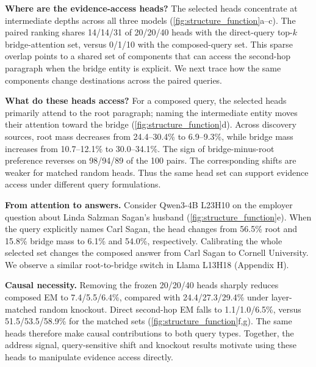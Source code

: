 \textbf{Where are the evidence-access heads?} The selected heads concentrate at intermediate depths across all three models (\cref{fig:structure_function}a--c). The paired ranking shares 14/14/31 of 20/20/40 heads with the direct-query top-$k$ bridge-attention set, versus 0/1/10 with the composed-query set. This sparse overlap points to a shared set of components that can access the second-hop paragraph when the bridge entity is explicit. We next trace how the same components change destinations across the paired queries.

\textbf{What do these heads access?} For a composed query, the selected heads primarily attend to the root paragraph; naming the intermediate entity moves their attention toward the bridge (\cref{fig:structure_function}d). Across discovery sources, root mass decreases from 24.4--30.4\% to 6.9--9.3\%, while bridge mass increases from 10.7--12.1\% to 30.0--34.1\%. The sign of bridge-minus-root preference reverses on 98/94/89 of the 100 pairs. The corresponding shifts are weaker for matched random heads. Thus the same head set can support evidence access under different query formulations.

\textbf{From attention to answers.} Consider Qwen3-4B L23H10 on the employer question about Linda Salzman Sagan's husband (\cref{fig:structure_function}e). When the query explicitly names Carl Sagan, the head changes from 56.5\% root and 15.8\% bridge mass to 6.1\% and 54.0\%, respectively. Calibrating the whole selected set changes the composed answer from Carl Sagan to Cornell University. We observe a similar root-to-bridge switch in Llama L13H18 (Appendix H).

\textbf{Causal necessity.} Removing the frozen 20/20/40 heads sharply reduces composed EM to 7.4/5.5/6.4\%, compared with 24.4/27.3/29.4\% under layer-matched random knockout. Direct second-hop EM falls to 1.1/1.0/6.5\%, versus 51.5/53.5/58.9\% for the matched sets (\cref{fig:structure_function}f,g). The same heads therefore make causal contributions to both query types. Together, the address signal, query-sensitive shift and knockout results motivate using these heads to manipulate evidence access directly.


